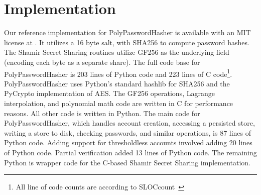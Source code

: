\section{Implementation}
\label{sec-implementation}


Our reference implementation for PolyPasswordHasher is available with an MIT license 
at \showurlx.  It utilizes
a 16 byte salt, with SHA256 to compute password hashes.   The Shamir
Secret Sharing routines
utilize GF256 as the underlying field (encoding each byte as a separate
share).   %
The full code base for PolyPasswordHasher is 203 lines of Python code and
223 lines of C code\footnote{
All line of code counts are according to SLOCcount~\cite{wheeler-sloccount}}.   
PolyPasswordHasher uses Python's standard hashlib for SHA256 and the PyCrypto
implementation of AES.
The GF256 operations, Lagrange interpolation, and polynomial math code
are written in C for performance reasons.   All other code is written in 
Python.  The main code for PolyPasswordHasher, which handles account
creation, accessing a persisted store, writing a store to disk,
checking passwords, and similar operations, is 87 lines of Python code.
Adding support for thresholdless accounts involved adding 20 lines of Python
code.   Partial verification added 13 lines of Python code.
The remaining Python is wrapper code for the C-based 
Shamir Secret Sharing implementation.




